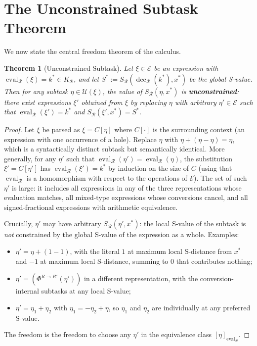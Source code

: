 \documentclass[twocolumn,11pt,a4paper]{article}
\theoremstyle{thmstyle}
\newtheorem{theorem}{Theorem}[section]
\theoremstyle{thmstyle}
\theoremstyle{definition}
\theoremstyle{remark}
\DeclareMathOperator{\eval}{eval}
\DeclareMathOperator{\dec}{dec}
\newcommand{\Expr}{\mathcal{E}}
\newcommand{\Sub}{\mathcal{U}}
\newcommand{\receiver}{\mathcal{R}}
\newcommand{\Sscalar}{S}
\begin{document}
\section{The Unconstrained Subtask Theorem}
\label{sec:unconstrained-subtask}

We now state the central freedom theorem of the
calculus.

\begin{theorem}[Unconstrained Subtask]\label{thm:unconstrained-subtask}
Let $\xi \in \Expr$ be an expression with
$\eval_{\receiver}(\xi) = k^{*} \in K_{\receiver}$,
and let
$\Sscalar^{*} := \Sscalar_{\receiver}(
\dec_{\receiver}(k^{*}), x^{*})$ be the global
S-value.  Then for any subtask $\eta \in \Sub(\xi)$,
the value of $\Sscalar_{\receiver}(\eta, x^{*})$ is
\textbf{unconstrained}: there exist expressions
$\xi'$ obtained from $\xi$ by replacing $\eta$ with
arbitrary $\eta' \in \Expr$ such that
$\eval_{\receiver}(\xi') = k^{*}$ and
$\Sscalar_{\receiver}(\xi', x^{*}) = \Sscalar^{*}$.
\end{theorem}

\begin{proof}
Let $\xi$ be parsed as
$\xi = C[\eta]$ where $C[\cdot]$ is the surrounding
context (an expression with one occurrence of a hole).
Replace $\eta$ with $\eta + (\eta - \eta) = \eta$,
which is a syntactically distinct subtask but
semantically identical.  More generally, for any
$\eta'$ such that $\eval_{\receiver}(\eta') =
\eval_{\receiver}(\eta)$, the substitution
$\xi' = C[\eta']$ has
$\eval_{\receiver}(\xi') = k^{*}$ by induction on
the size of $C$ (using that $\eval_{\receiver}$ is
a homomorphism with respect to the operations of
$\Expr$).  The set of such $\eta'$ is large: it
includes all expressions in any of the three
representations whose evaluation matches, all
mixed-type expressions whose conversions cancel,
and all signed-fractional expressions with
arithmetic equivalence.

Crucially, $\eta'$ may have arbitrary
$\Sscalar_{\receiver}(\eta', x^{*})$:
the local S-value of the subtask is
\emph{not} constrained by the global S-value of
the expression as a whole.  Examples:
\begin{itemize}[nosep]
\item $\eta' = \eta + (1 - 1)$, with the literal
      $1$ at maximum local S-distance from $x^{*}$
      and $-1$ at maximum local S-distance, summing
      to $0$ that contributes nothing;
\item $\eta' = (\Phi^{R \to R'}(\eta'))$ in a
      different representation, with the
      conversion-internal subtasks at any
      local S-value;
\item $\eta' = \eta_{1} + \eta_{2}$ with
      $\eta_{1} = -\eta_{2} + \eta$, so $\eta_{1}$
      and $\eta_{2}$ are individually at any
      preferred S-value.
\end{itemize}
The freedom is the freedom to choose any $\eta'$
in the equivalence class
$[\eta]_{\eval_{\receiver}}$.
\end{proof}
\end{document}
